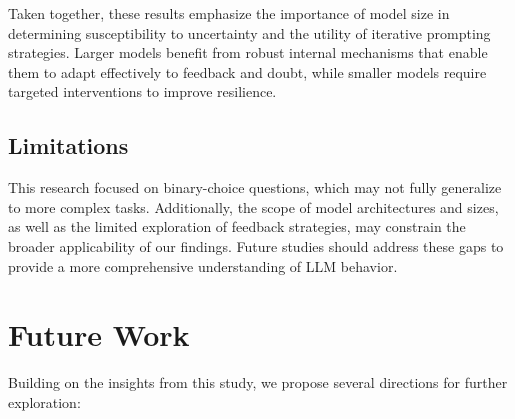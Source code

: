 Taken together, these results emphasize the importance of model size in determining susceptibility to uncertainty and the utility of iterative prompting strategies. Larger models benefit from robust internal mechanisms that enable them to adapt effectively to feedback and doubt, while smaller models require targeted interventions to improve resilience.

\subsection{Limitations}
This research focused on binary-choice questions, which may not fully generalize to more complex tasks. Additionally, the scope of model architectures and sizes, as well as the limited exploration of feedback strategies, may constrain the broader applicability of our findings. Future studies should address these gaps to provide a more comprehensive understanding of LLM behavior.

\section{Future Work}

Building on the insights from this study, we propose several directions for further exploration:


